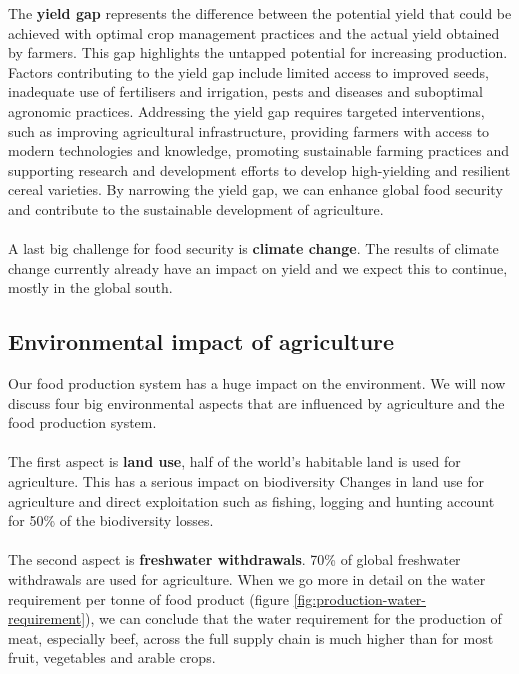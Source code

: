 \documentclass[../summary.tex]{subfiles}
\begin{document}
The \textbf{yield gap} represents the difference between the potential yield that could be achieved with optimal crop management practices and the actual yield obtained by farmers. This gap highlights the untapped potential for increasing production. Factors contributing to the yield gap include limited access to improved seeds, inadequate use of fertilisers and irrigation, pests and diseases and suboptimal agronomic practices. Addressing the yield gap requires targeted interventions, such as improving agricultural infrastructure, providing farmers with access to modern technologies and knowledge, promoting sustainable farming practices and supporting research and development efforts to develop high-yielding and resilient cereal varieties. By narrowing the yield gap, we can enhance global food security and contribute to the sustainable development of agriculture.
\\\\
A last big challenge for food security is \textbf{climate change}. The results of climate change currently already have an impact on yield and we expect this to continue, mostly in the global south.
\newpage

\subsection{Environmental impact of agriculture}

Our food production system has a huge impact on the environment. We will now discuss four big environmental aspects that are influenced by agriculture and the food production system.
\\\\
The first aspect is \textbf{land use}, half of the world's habitable land is used for agriculture. This has a serious impact on biodiversity Changes in land use for agriculture and direct exploitation such as fishing, logging and hunting account for 50\% of the biodiversity losses.
\\\\
The second aspect is \textbf{freshwater withdrawals}. 70\% of global freshwater withdrawals are used for agriculture. When we go more in detail on the water requirement per tonne of food product (figure \ref{fig:production-water-requirement}), we can conclude that the water requirement for the production of meat, especially beef, across the full supply chain is much higher than for most fruit, vegetables and arable crops.
\\
\end{document}
